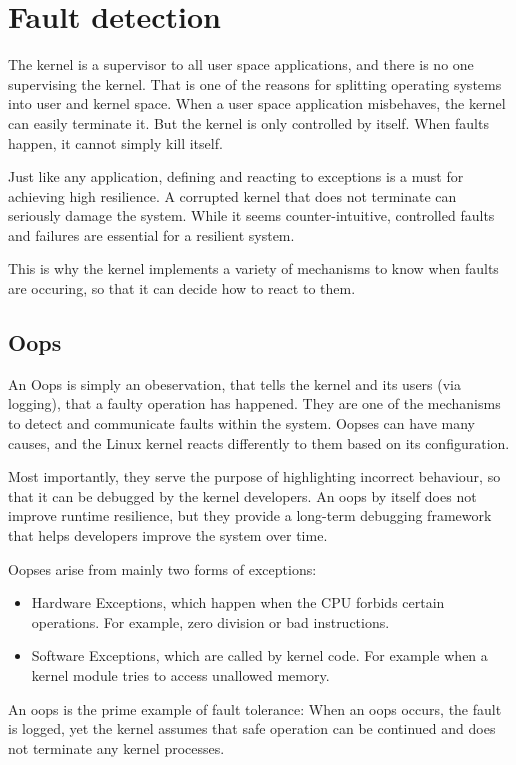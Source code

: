 \chapter{Fault detection}
The kernel is a supervisor to all user space applications, and there is no one supervising the kernel. That is one of the reasons for splitting operating systems into user and kernel space.
When a user space application misbehaves, the kernel can easily terminate it. But the kernel is only controlled by itself. When faults happen, it cannot simply kill itself.

Just like any application, defining and reacting to exceptions is a must for achieving high resilience. A corrupted kernel that does not terminate can seriously damage the system. While it seems counter-intuitive, controlled faults and failures are essential for a resilient system.

This is why the kernel implements a variety of mechanisms to know when faults are occuring, so that it can decide how to react to them.

\section{Oops}
An Oops is simply an obeservation, that tells the kernel and its users (via logging), that a faulty operation has happened. They are one of the mechanisms to detect and communicate faults within the system. 
Oopses can have many causes, and the Linux kernel reacts differently to them based on its configuration.\cite[ch.4, Oops Messages]{Corbet2005}

Most importantly, they serve the purpose of highlighting incorrect behaviour, so that it can be debugged by the kernel developers. An oops by itself does not improve runtime resilience, but they provide a long-term debugging framework that helps developers improve the system over time.

Oopses arise from mainly two forms of exceptions:
\begin{itemize}
        \item Hardware Exceptions, which happen when the CPU forbids certain operations. For example, zero division or bad instructions.
        \item Software Exceptions, which are called by kernel code. For example when a kernel module tries to access unallowed memory.
\end{itemize}

An oops is the prime example of fault tolerance: 
When an oops occurs, the fault is logged, yet the kernel assumes that safe operation can be continued and does not terminate any kernel processes.

